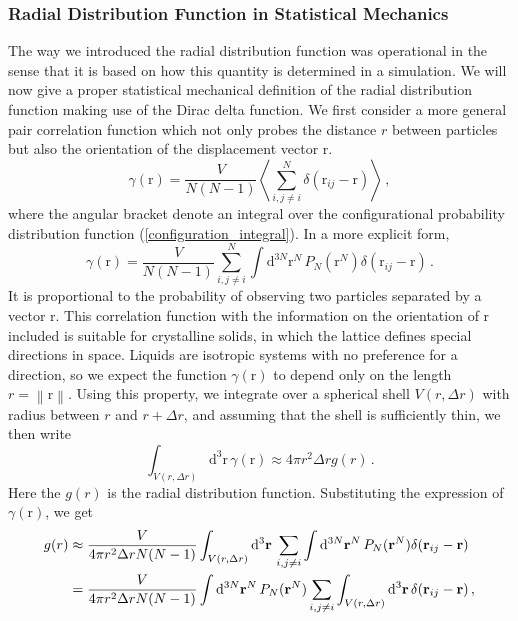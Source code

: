 \documentclass{article}
\theoremstyle{plain}\theoremheaderfont{\normalfont\itshape}\theorembodyfont{\rmfamily}\theoremseparator{.}\newtheorem*{rem}{Remark}\newtheorem*{ex}{Example}\newtheorem*{proof}{Proof}\newtheorem*{altp}{Alternative proof}
\theoremstyle{plain}\theoremheaderfont{\normalfont\bfseries}\theorembodyfont{\rmfamily}\theoremseparator{.}\newtheorem{thm}{Theorem}[section]\newtheorem{lem}[thm]{Lemma}\newtheorem{prop}[thm]{Proposition}\newtheorem*{cor}{Corollary}\newtheorem{defn}[thm]{Definition}\newtheorem{clm}[thm]{Claim}\newtheorem{clminproof}{Claim}\newtheorem{alg}[thm]{Algorithm}\newtheorem{hyp}[thm]{Hypothesis}\newtheorem{law}[thm]{Law}
\theoremstyle{break}\theoremheaderfont{\normalfont\itshape}\theorembodyfont{\rmfamily}\theoremseparator{.\medskip}\newtheorem*{proofskip}{Proof}\newtheorem*{exs}{Examples}\newtheorem*{rems}{Remarks}
\theoremstyle{break}\theoremheaderfont{\normalfont\bfseries}\theorembodyfont{\rmfamily}\theoremseparator{.\medskip}\newtheorem{lemskip}[thm]{Lemma}\newtheorem{defnskip}[thm]{Definition}\newtheorem{propskip}[thm]{Proposition}\newtheorem{thmskip}[thm]{Theorem}
\numberwithin{equation}{section}
\newcommand{\dd}[2][]{\mathrm{d}^{#1} #2\,}
\newcommand{\eval}[1]{\left\langle #1 \right\rangle}
\newcommand{\vb}[1]{\bm{\mathrm{#1}}}
\newcommand{\norm}[1]{\left\| #1 \right\|}
\begin{document}
    \subsubsection{Radial Distribution Function in Statistical Mechanics}
    The way we introduced the radial distribution function was operational in the sense that it is based on how this quantity is determined in a simulation. We will now give a proper statistical mechanical definition of the radial distribution function making use of the Dirac delta function. We first consider a more general pair correlation function which not only probes the distance \(r\) between particles but also the orientation of the displacement vector \(\vb{r}\).
    \begin{equation}\label{pair_correlation_function}
        \gamma(\vb{r})=\frac{V}{N(N-1)}\eval{\sum_{i,j\ne i}^{N}\delta(\vb{r}_{ij}-\vb{r})}\,,
    \end{equation}
    where the angular bracket denote an integral over the configurational probability distribution function (\ref{configuration_integral}). In a more explicit form,
    \begin{equation}
        \gamma(\vb{r})=\frac{V}{N(N-1)}\sum_{i,j\ne i}^{N}\int\dd[3N]{\vb{r}^N}P_N(\vb{r}^N)\delta(\vb{r}_{ij}-\vb{r})\,.
    \end{equation}
    It is proportional to the probability of observing two particles separated by a vector \(\vb{r}\). This correlation function with the information on the orientation of \(\vb{r}\) included is suitable for crystalline solids, in which the lattice defines special directions in space. Liquids are isotropic systems with no preference for a direction, so we expect the function \(\gamma(\vb{r})\) to depend only on the length \(r=\norm{\vb{r}}\). Using this property, we integrate over a spherical shell \(V(r,\Delta r)\) with radius between \(r\) and \(r+\Delta r\), and assuming that the shell is sufficiently thin, we then write
    \begin{equation}
        \int_{V(r,\Delta r)}\dd[3]{\vb{r}}\gamma(\vb{r})\approx 4\pi r^2\Delta r g(r)\,.
    \end{equation}
    Here the \(g(r)\) is the radial distribution function. Substituting the expression of \(\gamma(\vb{r})\), we get
    \begin{align}
        g(r)&\approx\frac{V}{4\pi r^2\Delta r N(N-1)}\int_{V(r,\Delta r)}\dd[3]{\vb{r}}\sum_{i,j\ne i}\int\dd[3N]{\vb{r}^N}P_N(\vb{r}^N)\delta(\vb{r}_{ij}-\vb{r})\notag \\
        &=\frac{V}{4\pi r^2\Delta r N(N-1)}\int\dd[3N]{\vb{r}^N}P_N(\vb{r}^N)\sum_{i,j\ne i}\int_{V(r,\Delta r)}\dd[3]{\vb{r}}\delta(\vb{r}_{ij}-\vb{r})\,,
    \end{align}
\end{document}
